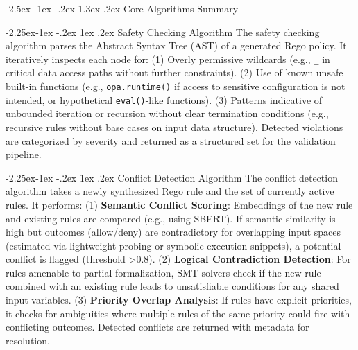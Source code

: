 \documentclass[manuscript,screen,review,anonymous,9pt]{acmart}
\makeatletter
\renewcommand\section{\@startsection{section}{1}{\z@}%
  {-2.5ex \@plus -1ex \@minus -.2ex}%
  {1.3ex \@plus.2ex}%
  {\normalfont\Large\bfseries}}
\renewcommand\subsection{\@startsection{subsection}{2}{\z@}%
  {-2.25ex\@plus -1ex \@minus -.2ex}%
  {1ex \@plus .2ex}%
  {\normalfont\large\bfseries}}
\makeatother
\begin{document}
\section{Core Algorithms Summary}
\label{app:algorithms}

\subsection{Safety Checking Algorithm}
The safety checking algorithm parses the Abstract Syntax Tree (AST) of a generated Rego policy. It iteratively inspects each node for: (1) Overly permissive wildcards (e.g., \texttt{\_} in critical data access paths without further constraints). (2) Use of known unsafe built-in functions (e.g., \texttt{opa.runtime()} if access to sensitive configuration is not intended, or hypothetical \texttt{eval()}-like functions). (3) Patterns indicative of unbounded iteration or recursion without clear termination conditions (e.g., recursive rules without base cases on input data structure). Detected violations are categorized by severity and returned as a structured set for the validation pipeline.

\subsection{Conflict Detection Algorithm}
The conflict detection algorithm takes a newly synthesized Rego rule and the set of currently active rules. It performs: (1) \textbf{Semantic Conflict Scoring}: Embeddings of the new rule and existing rules are compared (e.g., using SBERT). If semantic similarity is high but outcomes (allow/deny) are contradictory for overlapping input spaces (estimated via lightweight probing or symbolic execution snippets), a potential conflict is flagged (threshold >0.8). (2) \textbf{Logical Contradiction Detection}: For rules amenable to partial formalization, SMT solvers check if the new rule combined with an existing rule leads to unsatisfiable conditions for any shared input variables. (3) \textbf{Priority Overlap Analysis}: If rules have explicit priorities, it checks for ambiguities where multiple rules of the same priority could fire with conflicting outcomes. Detected conflicts are returned with metadata for resolution.
\end{document}

